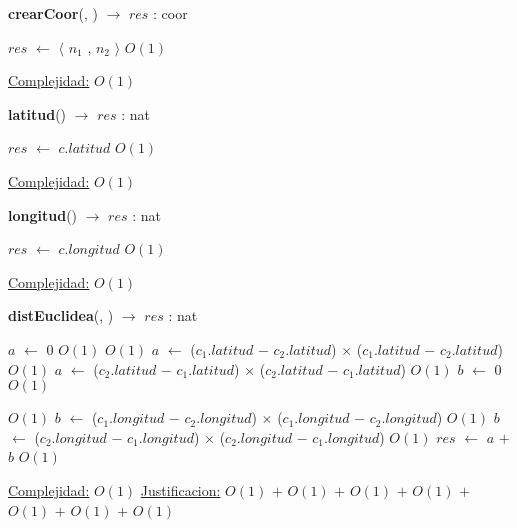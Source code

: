 \begin{Algoritmos}
   
\begin{algorithm}[H]{\textbf{crearCoor}(, ) $\to$ $res$ : coor}
    	\begin{algorithmic}[1]
			 \State $res$ $\gets$  $\langle$ $n_1$ , $n_2$ $\rangle$ \Comment $O(1)$

			\medskip
			\Statex \underline{Complejidad:} $O(1)$
    	\end{algorithmic}
\end{algorithm}
   
\begin{algorithm}[H]{\textbf{latitud}() $\to$ $res$ : nat}
    	\begin{algorithmic}[1]
			 \State $res$ $\gets$  $c$.$latitud$ \Comment $O(1)$

			\medskip
			\Statex \underline{Complejidad:} $O(1)$
			
    	\end{algorithmic}
\end{algorithm}


\begin{algorithm}[H]{\textbf{longitud}() $\to$ $res$ : nat}
    	\begin{algorithmic}[1]
			 \State $res$ $\gets$  $c$.$longitud$ \Comment $O(1)$

			\medskip
			\Statex \underline{Complejidad:} $O(1)$
    	\end{algorithmic}
\end{algorithm}

\begin{algorithm}[H]{\textbf{distEuclidea}(, ) $\to$ $res$ : nat}
    	\begin{algorithmic}[1]
    		 \State $a$ $\gets$ $0$ \Comment $O(1)$
    		 	\Comment $O(1)$
				\State $a$ $\gets$ ($c_1$.$latitud$ $-$ $c_2$.$latitud$) $\times$ ($c_1$.$latitud$ $-$ $c_2$.$latitud$) \Comment $O(1)$	
			\Else 
				\State $a$ $\gets$ ($c_2$.$latitud$ $-$ $c_1$.$latitud$) $\times$ ($c_2$.$latitud$ $-$ $c_1$.$latitud$) \Comment $O(1)$	
			\EndIf
			\State $b$ $\gets$ $0$ \Comment $O(1)$

				\Comment $O(1)$
				\State $b$ $\gets$ ($c_1$.$longitud$ $-$ $c_2$.$longitud$) $\times$ ($c_1$.$longitud$ $-$ $c_2$.$longitud$)  \Comment $O(1)$	
			\Else 
				\State $b$ $\gets$ ($c_2$.$longitud$ $-$ $c_1$.$longitud$) $\times$ ($c_2$.$longitud$ $-$ $c_1$.$longitud$) \Comment $O(1)$	
			\EndIf
			\State $res$ $\gets$  $a$ $+$ $b$ \Comment $O(1)$

			\medskip
			\Statex \underline{Complejidad:} $O(1)$
			\Statex \underline{Justificacion:} $O(1)$ $+$ $O(1)$ $+$ $O(1)$ $+$ $O(1)$ $+$ $O(1)$ $+$ $O(1)$ $+$ $O(1)$
    	\end{algorithmic}
\end{algorithm}

\end{Algoritmos}